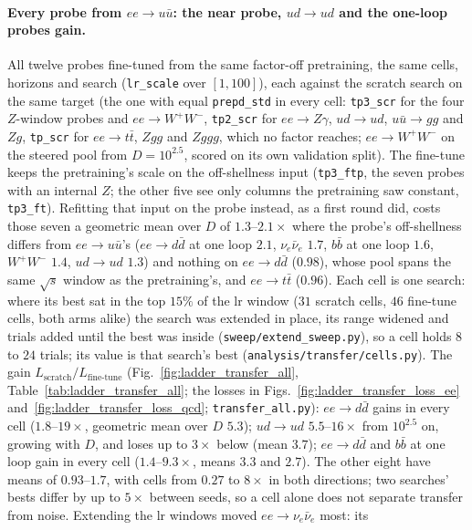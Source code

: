 \documentclass[11pt]{article}
\newcommand{\code}[1]{\texttt{#1}}
\begin{document}
\paragraph{Every probe from $ee\to u\bar u$: the near probe, $ud\to ud$ and the one-loop probes gain.}
All twelve probes fine-tuned from the same factor-off pretraining, the same cells, horizons and search (\code{lr\_scale}
over $[1,100]$), each against the scratch search on the same target (the one with equal \code{prepd\_std} in every cell:
\code{tp3\_scr} for the four $Z$-window probes and $ee\to W^+W^-$, \code{tp2\_scr} for $ee\to Z\gamma$, $ud\to ud$,
$u\bar u\to gg$ and $Zg$, \code{tp\_scr} for $ee\to t\bar t$, $Zgg$ and $Zggg$, which no factor reaches;
$ee\to W^+W^-$ on the steered pool from $D=10^{2.5}$, scored on its own validation split). The fine-tune keeps the
pretraining's scale on the off-shellness input (\code{tp3\_ftp}, the seven probes with an internal $Z$; the other five
see only columns the pretraining saw constant, \code{tp3\_ft}). Refitting that input on the probe instead, as a first
round did, costs those seven a geometric mean over $D$ of $1.3$--$2.1\times$ where the probe's off-shellness differs
from $ee\to u\bar u$'s ($ee\to d\bar d$ at one loop $2.1$, $\nu_e\bar\nu_e$ $1.7$, $b\bar b$ at one loop $1.6$,
$W^+W^-$ $1.4$, $ud\to ud$ $1.3$) and nothing on $ee\to d\bar d$ ($0.98$), whose pool spans the same $\sqrt s$ window
as the pretraining's, and $ee\to t\bar t$ ($0.96$). Each cell is one search: where its best sat in the top $15\%$ of
the lr window ($31$ scratch cells, $46$ fine-tune cells, both arms alike) the search was extended in place, its range
widened and trials added until the best was inside (\code{sweep/extend\_sweep.py}), so a cell holds $8$ to $24$
trials; its value is that search's best (\code{analysis/transfer/cells.py}). The gain
$L_\text{scratch}/L_\text{fine-tune}$ (Fig.~\ref{fig:ladder_transfer_all}, Table~\ref{tab:ladder_transfer_all}; the
losses in Figs.~\ref{fig:ladder_transfer_loss_ee} and~\ref{fig:ladder_transfer_loss_qcd}; \code{transfer\_all.py}):
$ee\to d\bar d$ gains in every cell ($1.8$--$19\times$, geometric mean over $D$ $5.3$); $ud\to ud$ $5.5$--$16\times$
from $10^{2.5}$ on, growing with $D$, and loses up to $3\times$ below (mean $3.7$); $ee\to d\bar d$ and $b\bar b$ at one
loop gain in every cell ($1.4$--$9.3\times$, means $3.3$ and $2.7$). The other eight have means of $0.93$--$1.7$, with
cells from $0.27$ to $8\times$ in both directions; two searches' bests differ by up to $5\times$ between seeds, so a
cell alone does not separate transfer from noise. Extending the lr windows moved $ee\to\nu_e\bar\nu_e$ most: its
\end{document}
